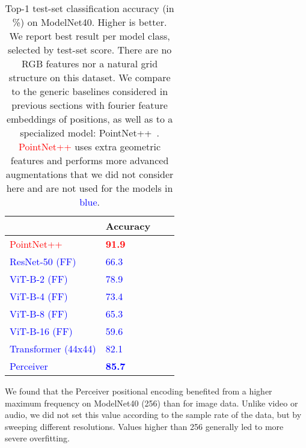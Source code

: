 \documentclass{article}
\begin{document}
\begin{table}[t]
\centering
\begin{tabular}{|l|l|l|l|}
\hline
                                                      & Accuracy                         \\ \hline
\textcolor{red}{PointNet++~\cite{qi2017pointnet++}}   &  \textcolor{red}{\textbf{91.9}}  \\ \hline
\textcolor{blue}{ResNet-50 (FF)}                      &  \textcolor{blue}{66.3}          \\        
\textcolor{blue}{ViT-B-2 (FF)}                        &  \textcolor{blue}{78.9}          \\        
\textcolor{blue}{ViT-B-4 (FF)}                        &  \textcolor{blue}{73.4}          \\        
\textcolor{blue}{ViT-B-8 (FF)}                        &  \textcolor{blue}{65.3}          \\        
\textcolor{blue}{ViT-B-16 (FF)}                       &  \textcolor{blue}{59.6}          \\        
\textcolor{blue}{Transformer (44x44)}                 &  \textcolor{blue}{82.1}          \\ \hline
\textcolor{blue}{Perceiver}                           &  \textcolor{blue}{\textbf{85.7}} \\ \hline

\end{tabular}
\caption{Top-1 test-set classification accuracy (in \%) on ModelNet40. Higher is better. We report best result per model class, selected by test-set score. There are no RGB features nor a natural grid structure on this dataset. We compare to the generic baselines considered in previous sections with fourier feature embeddings of positions, as well as to a specialized model: PointNet++~\cite{qi2017pointnet++}. \textcolor{red}{PointNet++} uses extra geometric features and performs more advanced augmentations that we did not consider here and are not used for the models in \textcolor{blue}{blue}. 
\label{modelnet40}}
\vspace{-12pt}
\end{table}

We found that the Perceiver positional encoding benefited from a higher maximum frequency on ModelNet40 (256) than for image data. Unlike video or audio, we did not set this value according to the sample rate of the data, but by sweeping different resolutions. Values higher than 256 generally led to more severe overfitting.
\end{document}
